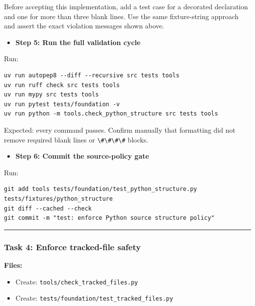 \documentclass[
  letterpaper,
]{article}
\newcommand{\passthrough}[1]{#1}
\providecommand{\tightlist}{%
  \setlength{\itemsep}{0pt}\setlength{\parskip}{0pt}}
\begin{document}
Before accepting this implementation, add a test case for a decorated declaration and one for more than three blank
lines. Use the same fixture-string approach and assert the exact violation messages shown above.

\begin{itemize}
\tightlist
\item[$\boxtimes$]
  \textbf{Step 5: Run the full validation cycle}
\end{itemize}

Run:

\begin{lstlisting}
uv run autopep8 --diff --recursive src tests tools
uv run ruff check src tests tools
uv run mypy src tests tools
uv run pytest tests/foundation -v
uv run python -m tools.check_python_structure src tests tools
\end{lstlisting}

Expected: every command passes. Confirm manually that formatting did not remove required blank lines or
\passthrough{\lstinline!\#\#\#\#!} blocks.

\begin{itemize}
\tightlist
\item[$\boxtimes$]
  \textbf{Step 6: Commit the source-policy gate}
\end{itemize}

Run:

\begin{lstlisting}
git add tools tests/foundation/test_python_structure.py tests/fixtures/python_structure
git diff --cached --check
git commit -m "test: enforce Python source structure policy"
\end{lstlisting}

\begin{center}\rule{0.5\linewidth}{0.5pt}\end{center}

\subsubsection{Task 4: Enforce tracked-file safety}\label{task-4-enforce-tracked-file-safety}

\textbf{Files:}

\begin{itemize}
\tightlist
\item
  Create: \nolinkurl{tools/check_tracked_files.py}
\item
  Create: \nolinkurl{tests/foundation/test_tracked_files.py}
\end{itemize}
\end{document}
